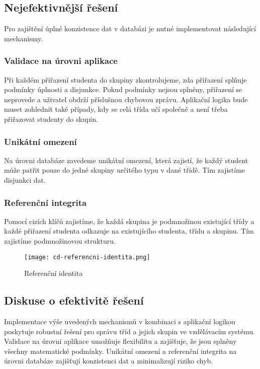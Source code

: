 \subsection*{Nejefektivnější řešení}

Pro zajištění úplné konzistence dat v databázi je nutné implementovat následující mechanismy.

\subsubsection*{Validace na úrovni aplikace}

Při každém přiřazení studenta do skupiny zkontrolujeme, zda přiřazení splňuje podmínky úplnosti a disjunkce. Pokud podmínky nejsou splněny, přiřazení se neprovede a uživatel obdrží příslušnou chybovou zprávu. Aplikační logika bude muset zohlednit také případy, kdy se celá třída učí společně a není třeba přiřazovat studenty do skupin.

\subsubsection*{Unikátní omezení}

Na úrovni databáze zavedeme unikátní omezení, která zajistí, že každý student může patřit pouze do jedné skupiny určitého typu v dané třídě. Tím zajistíme disjunkci dat.

\subsubsection*{Referenční integrita}

Pomocí cizích klíčů zajistíme, že každá skupina je podmnožinou existující třídy a každé přiřazení studenta odkazuje na existujícího studenta, třídu a skupinu. Tím zajistíme podmnožinovou strukturu.

\begin{figure}[H]
    \centering
    \texttt{[image: cd-referencni-identita.png]}
    \caption{Referenční identita}
    \label{fig:cd-referencni-identita}
 \end{figure}

\subsection*{Diskuse o efektivitě řešení}

Implementace výše uvedených mechanismů v kombinaci s aplikační logikou poskytuje robustní řešení pro správu tříd a jejich skupin ve vzdělávacím systému. Validace na úrovni aplikace umožňuje flexibilitu a zajišťuje, že jsou splněny všechny matematické podmínky. Unikátní omezení a referenční integrita na úrovni databáze zajišťují konzistenci dat a minimalizují riziko chyb.

